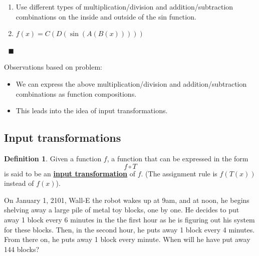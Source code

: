\documentclass[11pt]{article}
\newenvironment{task}
	{\begin{mdframed}[linecolor=lightgray, linewidth=3pt]\raggedright}
	{\end{mdframed}}
\renewcommand\emph[1]{\underline{\bf{#1}}} %
\theoremstyle{definition}
\newtheorem{definition}[theorem]{Definition}
\newenvironment{solution}{{\it Solution.} }{\hfill {\color{lightgray}$\blacksquare$}}
\begin{document}
\begin{solution}
\begin{enumerate}
\item Use different types of multiplication/division and addition/subtraction combinations on the inside and outside of the sin function.
\item $f(x)= C(D(\sin(A(B(x)))))$
\end{enumerate} \vspace*{-8pt}$\;$
\vspace*{-10pt}
\end{solution}


Observations based on problem:
\begin{itemize}
\item We can express the above multiplication/division and addition/subtraction combinations as function compositions. 
\item This leads into the idea of input transformations.
\end{itemize}

\subsection{Input transformations}

\begin{definition}\label{d: input transformation}
Given a function $f$, a function that can be expressed in the form $$f\circ T$$ is said to be an \emph{input transformation} of $f$. (The assignment rule is $f(T(x))$ instead of $f(x)$).
\end{definition}

\begin{task}
On January 1, 2101, Wall-E the robot wakes up at 9am, and at noon, he begins shelving away a large pile of metal toy blocks, one by one. He decides to put away 1 block every 6 minutes in the the first hour as he is figuring out his system for these blocks. Then, in the second hour, he puts away 1 block every 4 minutes. From there on, he puts away 1 block every minute. When will he have put away 144 blocks?
\end{task}
\end{document}
